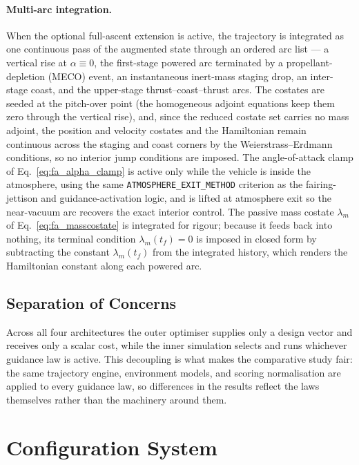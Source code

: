 \paragraph{Multi-arc integration.}
When the optional full-ascent extension is active, the trajectory is integrated as
one continuous pass of the augmented state through an ordered arc list --- a
vertical rise at $\alpha\equiv0$, the first-stage powered arc terminated by a
propellant-depletion (MECO) event, an instantaneous inert-mass staging drop, an
inter-stage coast, and the upper-stage thrust--coast--thrust arcs. The costates are
seeded at the pitch-over point (the homogeneous adjoint equations keep them zero
through the vertical rise), and, since the reduced costate set carries no mass
adjoint, the position and velocity costates and the Hamiltonian remain continuous
across the staging and coast corners by the Weierstrass--Erdmann conditions, so no
interior jump conditions are imposed. The angle-of-attack clamp of
Eq.~\eqref{eq:fa_alpha_clamp} is active only while the vehicle is inside the
atmosphere, using the same \texttt{ATMOSPHERE\_EXIT\_METHOD} criterion as the
fairing-jettison and guidance-activation logic, and is lifted at atmosphere exit so
the near-vacuum arc recovers the exact interior control. The passive mass costate
$\lambda_m$ of Eq.~\eqref{eq:fa_masscostate} is integrated for rigour; because it
feeds back into nothing, its terminal condition $\lambda_m(t_f)=0$ is imposed in
closed form by subtracting the constant $\lambda_m(t_f)$ from the integrated
history, which renders the Hamiltonian constant along each powered arc.

\subsection{Separation of Concerns}
\label{ssec:separation}

Across all four architectures the outer optimiser supplies only a design vector
and receives only a scalar cost, while the inner simulation selects and runs
whichever guidance law is active. This decoupling is what makes the comparative
study fair: the same trajectory engine, environment models, and scoring
normalisation are applied to every guidance law, so differences in the results
reflect the laws themselves rather than the machinery around them.

\section{Configuration System}
\label{sec:configuration}

